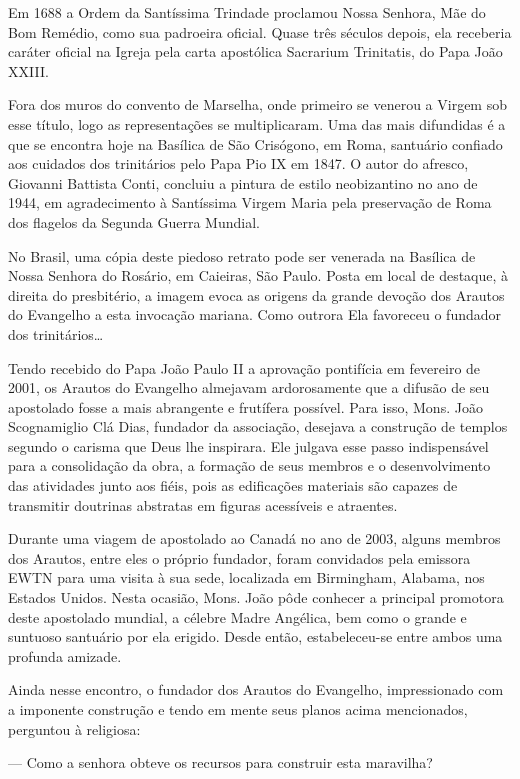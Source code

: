 \documentclass[a4paper,14pt]{extarticle} \usepackage[utf8]{inputenc}
\begin{document}
Em 1688 a Ordem da Santíssima Trindade proclamou Nossa Senhora, Mãe do Bom Remédio, como sua padroeira oficial. Quase três séculos depois, ela receberia caráter oficial na Igreja pela carta apostólica Sacrarium Trinitatis, do Papa João XXIII.

Fora dos muros do convento de Marselha, onde primeiro se venerou a Virgem sob esse título, logo as representações se multiplicaram. Uma das mais difundidas é a que se encontra hoje na Basílica de São Crisógono, em Roma, santuário confiado aos cuidados dos trinitários pelo Papa Pio IX em 1847. O autor do afresco, Giovanni Battista Conti, concluiu a pintura de estilo neobizantino no ano de 1944, em agradecimento à Santíssima Virgem Maria pela preservação de Roma dos flagelos da Segunda Guerra Mundial.

No Brasil, uma cópia deste piedoso retrato pode ser venerada na Basílica de Nossa Senhora do Rosário, em Caieiras, São Paulo. Posta em local de destaque, à direita do presbitério, a imagem evoca as origens da grande devoção dos Arautos do Evangelho a esta invocação mariana.
Como outrora Ela favoreceu o fundador dos trinitários…

Tendo recebido do Papa João Paulo II a aprovação pontifícia em fevereiro de 2001, os Arautos do Evangelho almejavam ardorosamente que a difusão de seu apostolado fosse a mais abrangente e frutífera possível. Para isso, Mons. João Scognamiglio Clá Dias, fundador da associação, desejava a construção de templos segundo o carisma que Deus lhe inspirara. Ele julgava esse passo indispensável para a consolidação da obra, a formação de seus membros e o desenvolvimento das atividades junto aos fiéis, pois as edificações materiais são capazes de transmitir doutrinas abstratas em figuras acessíveis e atraentes.

Durante uma viagem de apostolado ao Canadá no ano de 2003, alguns membros dos Arautos, entre eles o próprio fundador, foram convidados pela emissora EWTN para uma visita à sua sede, localizada em Birmingham, Alabama, nos Estados Unidos. Nesta ocasião, Mons. João pôde conhecer a principal promotora deste apostolado mundial, a célebre Madre Angélica, bem como o grande e suntuoso santuário por ela erigido. Desde então, estabeleceu-se entre ambos uma profunda amizade.

Ainda nesse encontro, o fundador dos Arautos do Evangelho, impressionado com a imponente construção e tendo em mente seus planos acima mencionados, perguntou à religiosa:

— Como a senhora obteve os recursos para construir esta maravilha?
\end{document}
